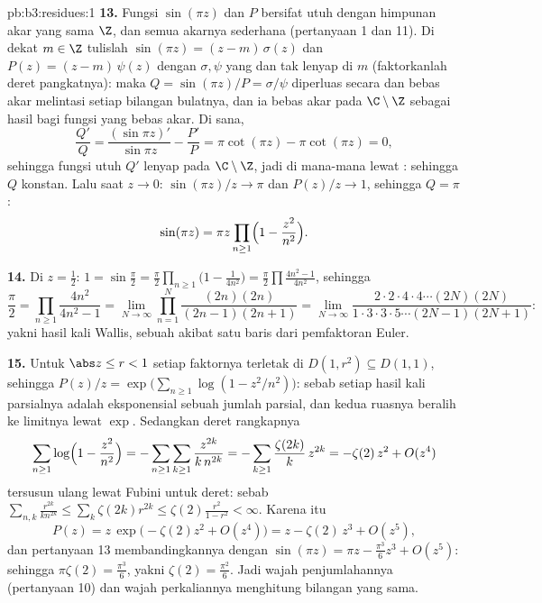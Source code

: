 \begin{solution}{pb:b3:residues:1}
\textbf{13.} Fungsi $\sin(\pi z)$ dan $P$ bersifat utuh dengan himpunan
akar yang sama $\Z$, dan semua akarnya sederhana (pertanyaan 1 dan 11). Di dekat
$m \in \Z$ tulislah $\sin(\pi z) = (z - m)\,\sigma(z)$ dan
$P(z) = (z - m)\,\psi(z)$ dengan $\sigma, \psi$ yang 
dan tak lenyap di $m$ (faktorkanlah deret pangkatnya): maka $Q =
\sin(\pi z)/P = \sigma/\psi$ diperluas secara  dan
bebas akar melintasi setiap bilangan bulatnya, dan ia bebas akar pada
$\C\setminus\Z$ sebagai hasil bagi fungsi yang bebas akar. Di sana,
\[
\frac{Q'}{Q} = \frac{(\sin\pi z)'}{\sin\pi z} -
\frac{P'}{P} = \pi\cot(\pi z) - \pi\cot(\pi z) = 0 ,
\]
sehingga fungsi utuh $Q'$ lenyap pada $\C\setminus\Z$,
jadi di mana-mana lewat : sehingga $Q$ konstan. Lalu saat $z \to
0$: $\sin(\pi z)/z \to \pi$ dan $P(z)/z \to 1$, sehingga $Q =
\pi$:
\[
\sin(\pi z) = \pi z\prod_{n\geq1}
\Bigl(1 - \frac{z^2}{n^2}\Bigr) .
\]

\textbf{14.} Di $z = \frac12$: $1 = \sin\frac\pi2 =
\frac\pi2\prod_{n\geq1}\bigl(1 - \frac1{4n^2}\bigr) =
\frac\pi2\prod\frac{4n^2-1}{4n^2}$, sehingga
\[
\frac\pi2 = \prod_{n\geq1}\frac{4n^2}{4n^2 - 1}
= \lim_{N\to\infty}\prod_{n=1}^N
\frac{(2n)(2n)}{(2n-1)(2n+1)}
= \lim_{N\to\infty}
\frac{2\cdot2\cdot4\cdot4\cdots(2N)(2N)}
{1\cdot3\cdot3\cdot5\cdots(2N-1)(2N+1)} :
\]
yakni hasil kali Wallis, sebuah akibat satu baris dari pemfaktoran
Euler.

\textbf{15.} Untuk $\abs z \leq r < 1$ setiap faktornya terletak di
$D(1, r^2) \subseteq D(1, 1)$, sehingga $P(z)/z = \exp\bigl(
\sum_{n\geq1}\log(1 - z^2/n^2)\bigr)$: sebab setiap hasil kali parsialnya
adalah eksponensial sebuah jumlah parsial, dan kedua ruasnya beralih ke
limitnya lewat  $\exp$. Sedangkan deret rangkapnya
\[
\sum_{n\geq1}\log\Bigl(1 - \frac{z^2}{n^2}\Bigr)
= -\sum_{n\geq1}\sum_{k\geq1}\frac{z^{2k}}{k\,n^{2k}}
= -\sum_{k\geq1}\frac{\zeta(2k)}k\,z^{2k}
= -\zeta(2)\,z^2 + O(z^4)
\]
tersusun ulang lewat Fubini untuk deret: sebab $\sum_{n,k}
\frac{r^{2k}}{kn^{2k}} \leq \sum_k\zeta(2k)r^{2k} \leq
\zeta(2)\frac{r^2}{1-r^2} < \infty$. Karena itu
\[
P(z) = z\,\exp\bigl(-\zeta(2)z^2 + O(z^4)\bigr)
= z - \zeta(2)\,z^3 + O(z^5) ,
\]
dan pertanyaan 13 membandingkannya dengan $\sin(\pi z) = \pi z -
\frac{\pi^3}6z^3 + O(z^5)$: sehingga $\pi\zeta(2) = \frac{\pi^3}6$,
yakni $\zeta(2) = \frac{\pi^2}6$. Jadi wajah penjumlahannya
(pertanyaan 10) dan wajah perkaliannya menghitung bilangan yang
sama.


\end{solution}

